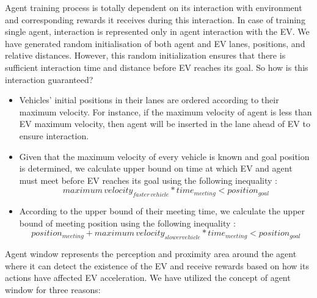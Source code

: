 \noindent Agent training process is totally dependent on its interaction with environment and corresponding rewards it receives during this interaction. In case of training single agent, interaction is represented only in agent interaction with the EV. We have generated random initialisation of both agent and EV lanes, positions, and relative distances. However, this random initialization ensures that there is sufficient interaction time and distance before EV reaches its goal. So how is this interaction guaranteed?
\begin{itemize}
    \item Vehicles’ initial positions in their lanes are ordered according to their maximum velocity.  For instance, if the maximum velocity of agent is less than EV maximum velocity, then agent will be inserted in the lane ahead of EV to ensure interaction. 
    
    \item Given that the maximum velocity of every vehicle is known and goal position is determined, we calculate upper bound on time at which EV and agent must meet before EV reaches its goal using the following inequality :
    \begin{equation}
    maximum\,velocity_{faster\,vehicle} * time_{meeting} <position_{goal}
    \end{equation}
    
    \item According to the upper bound of their meeting time, we calculate the upper bound of meeting position using the following inequality :
    \begin{equation}
        position_{meeting} + maximum\,velocity_{slower vehicle}*time_{meeting}<position_{goal} 
    \end{equation} 
    
\end{itemize} 
\noindent
Agent window represents the perception and proximity area around the agent where it can detect the existence of the EV and receive rewards based on how its actions have affected EV acceleration. We have utilized the concept of agent window for three reasons: 
